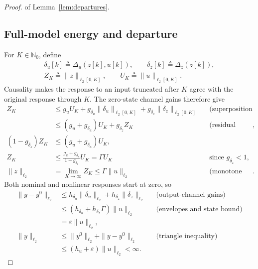 \documentclass{l4dc2027}
\newcommand{\eqdef}{\triangleq}
\begin{document}
\begin{proof} of Lemma~\ref{lem:departures}.
\subsection{Full-model energy and departure}
For \mbox{$K\in\mathbb N_0$}, define
\[
 \begin{gathered}
 \delta_u[k]\eqdef\Delta_u(z[k],u[k]),\qquad
 \delta_z[k]\eqdef\Delta_z(z[k]),\\
 Z_K\eqdef\|z\|_{\ell_2[0,K]},\qquad
 U_K\eqdef\|u\|_{\ell_2[0,K]}.
 \end{gathered}
\]
Causality makes the response to an input truncated after \mbox{$K$} agree with the original response through \mbox{$K$}.
The zero-state channel gains therefore give
\[
 \begin{aligned}
 Z_K
 &\le g_uU_K+g_{\delta_u}\|\delta_u\|_{\ell_2[0,K]}
            +g_{\delta_z}\|\delta_z\|_{\ell_2[0,K]}
 &&\text{(superposition and channel gains)}\\
 &\le(g_u+g_{\delta_u})U_K+g_{\delta_z}Z_K
 &&\text{(residual envelopes)},\\
 (1-g_{\delta_z})Z_K&\le(g_u+g_{\delta_u})U_K,\\
 Z_K&\le\frac{g_u+g_{\delta_u}}{1-g_{\delta_z}}U_K=\Gamma U_K
 &&\text{since }g_{\delta_z}<1,\\
 \|z\|_{\ell_2}&=\lim_{K\to\infty}Z_K\le\Gamma\|u\|_{\ell_2}
 &&\text{(monotone limits)}.
 \end{aligned}
\]
Both nominal and nonlinear responses start at zero, so
\[
 \begin{aligned}
 \|y-y^0\|_{\ell_2}
 &\le h_{\delta_u}\|\delta_u\|_{\ell_2}
      +h_{\delta_z}\|\delta_z\|_{\ell_2}
 &&\text{(output-channel gains)}\\
 &\le(h_{\delta_u}+h_{\delta_z}\Gamma)\|u\|_{\ell_2}
 &&\text{(envelopes and state bound)}\\
 &=\varepsilon\|u\|_{\ell_2},\\
 \|y\|_{\ell_2}
 &\le\|y^0\|_{\ell_2}+\|y-y^0\|_{\ell_2}
 &&\text{(triangle inequality)}\\
 &\le(h_u+\varepsilon)\|u\|_{\ell_2}<\infty.
 \end{aligned}
\]

\end{proof}
\end{document}
